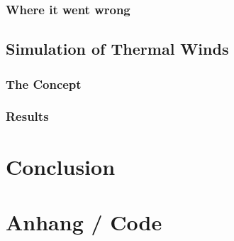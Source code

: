 \documentclass[12pt, a4paper, twoside]{article}
\begin{document}
		\subsubsection{Where it went wrong}
	
	\subsection{Simulation of Thermal Winds}
		\subsubsection{The Concept}
		\subsubsection{Results}

	\newpage
\section{Conclusion}

	\newpage
\section{Anhang / Code}
\pagebreak
\end{document}
